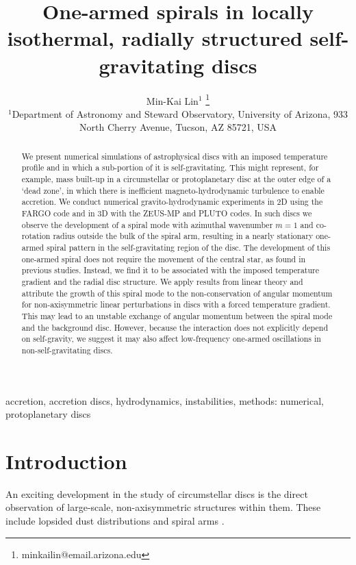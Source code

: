 \documentclass[useAMS,usenatbib]{mn2e}
\title[One-armed spirals]{One-armed spirals in 
  locally isothermal, radially structured self-gravitating discs}
\author[Lin]{Min-Kai Lin$^{1}$
  \thanks{ minkailin@email.arizona.edu} \\ 
  $^1$Department of Astronomy and Steward Observatory, University of
  Arizona, 933 North Cherry Avenue, Tucson, AZ 85721, USA 
}
\begin{document}
\maketitle
\begin{abstract} 
  We present numerical simulations of astrophysical discs with an 
  imposed temperature profile and in which a sub-portion of it is
  self-gravitating. This might represent, for example, mass  
  built-up in a circumstellar or protoplanetary
  disc at the outer edge of a `dead zone', in which there
  is inefficient magneto-hydrodynamic turbulence to enable accretion. 
  We conduct numerical gravito-hydrodynamic experiments in 2D using
  the FARGO code and in 3D with the ZEUS-MP and PLUTO codes. In such
  discs we observe the development of a 
  spiral mode with azimuthal wavenumber $m=1$ and co-rotation radius 
  outside the bulk of the spiral arm, resulting in a nearly stationary 
  one-armed spiral pattern in the self-gravitating region of the
  disc. The development of this one-armed 
  spiral does not require the movement of  
  the central star, as found in previous studies. Instead, we find it
  to be associated with the imposed 
  temperature gradient and the radial disc structure. 
  We apply results from linear theory and attribute the
  growth of this spiral mode to the non-conservation of angular momentum
  for non-axisymmetric linear perturbations in discs with a forced temperature
  gradient. This may lead to an unstable exchange of angular momentum
  between the spiral mode 
  and the background disc. However, because the interaction does
  not explicitly depend on self-gravity, we suggest it may also
  affect low-frequency one-armed oscillations in non-self-gravitating
  discs. 
\end{abstract}

\begin{keywords}
  accretion, accretion discs, hydrodynamics, instabilities, methods: numerical, protoplanetary discs 
\end{keywords}

\section{Introduction}\label{intro}
An exciting development in the study of circumstellar 
discs is the direct observation of large-scale, non-axisymmetric
structures within them. These
include lopsided dust distributions 
\citep{marel13,fukagawa13,casassus13,isella13,perez14,follette14} and
spiral arms 
\citep{hashimoto11,muto12,boccaletti14,grady13,christiaens14,avenhaus14}. 
\end{document}
